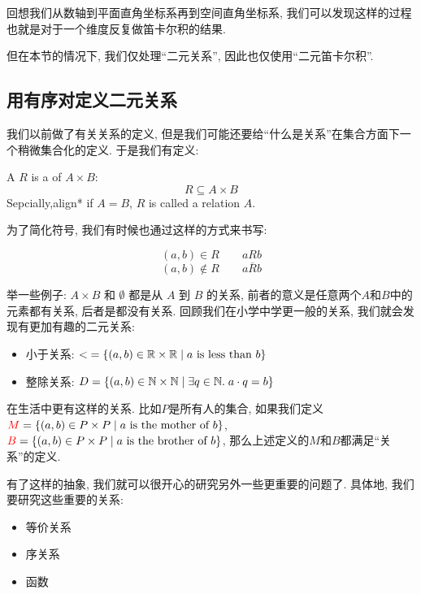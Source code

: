回想我们从数轴到平面直角坐标系再到空间直角坐标系, 我们可以发现这样的过程也就是对于一个维度反复做笛卡尔积的结果. 

但在本节的情况下, 我们仅处理``二元关系'', 因此也仅使用``二元笛卡尔积''. 


\subsection{用有序对定义二元关系}

我们以前做了有关关系的定义, 但是我们可能还要给``什么是关系''在集合方面下一个稍微集合化的定义. 于是我们有定义: 
\begin{definition}[关系 (Relations)]
  A  $R$ 
  is a  of $A \times B$:
  \[
    {R \subseteq A \times B}
  \]
  Sepcially,{align*} if $A = B$, $R$ is called a relation  $A$.
\end{definition}

为了简化符号, 我们有时候也通过这样的方式来书写: 

\begin{definition}[Notations]
  \[
    (a, b) \in R \qquad a R b
  \]
  \[
    (a, b) \notin R \qquad a \overline{R} b
  \]
\end{definition}

举一些例子: $A\times B$ 和 $\emptyset$ 都是从 $A$ 到 $B$ 的关系, 前者的意义是任意两个$A$和$B$中的元素都有关系, 后者是都没有关系. 回顾我们在小学中学更一般的关系, 我们就会发现有更加有趣的二元关系: 
\begin{itemize}
  \item 小于关系: $<\; = \{(a, b) \in \mathbb{R} \times \mathbb{R} \mid a \text{ is less than } b\}$
  \item 整除关系: $D = \{(a, b) \in \mathbb{N} \times \mathbb{N} \mid \exists q \in \mathbb{N}.\; a \cdot q = b\}$
\end{itemize}

在生活中更有这样的关系. 比如$P$是所有人的集合, 如果我们定义$\textcolor{red}{M} = \{(a, b) \in P \times P \mid a \text{ is the mother of } b\}$, $\textcolor{red}{B} = \{(a, b) \in P \times P \mid a \text{ is the brother of } b\}$, 那么上述定义的$M$和$B$都满足``关系''的定义.

有了这样的抽象, 我们就可以很开心的研究另外一些更重要的问题了. 具体地, 我们要研究这些重要的关系: 
\begin{itemize}
  \item 等价关系
  \item 序关系
  \item 函数
\end{itemize}


